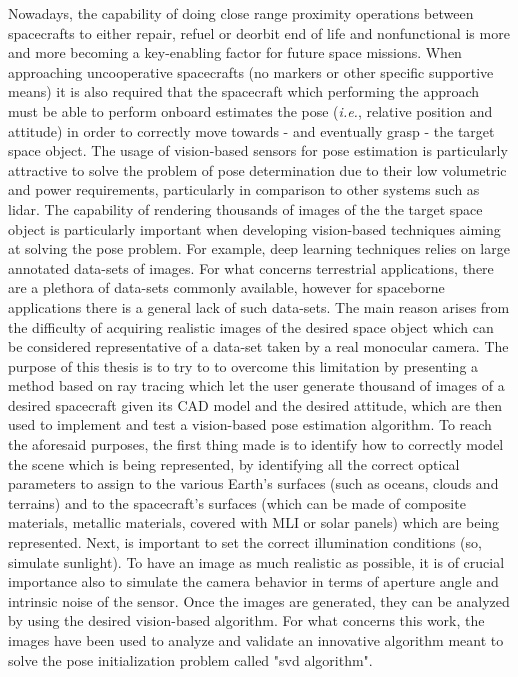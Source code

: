 Nowadays, the capability of doing close range proximity operations between spacecrafts to either repair, refuel or deorbit end of life and nonfunctional is more and more becoming a key-enabling factor for future space missions. When approaching uncooperative spacecrafts (no markers or other specific supportive means) it is also required that the spacecraft which performing the approach must be able to perform onboard estimates the pose (\textit{i.e.}, relative position and attitude) in order to correctly move towards - and eventually grasp - the target space object. The usage of vision-based sensors for pose estimation is particularly attractive to solve the problem of pose determination due to their low volumetric and power requirements, particularly in comparison to other systems such as \acrshort{lidar}. The capability of rendering thousands of images of the the target space object is particularly important when developing vision-based techniques aiming at solving the pose problem. For example, deep learning techniques relies on large annotated data-sets of images. For what concerns terrestrial applications, there are a plethora of data-sets commonly available, however for spaceborne applications there is a general lack of such data-sets. The main reason arises from the difficulty of acquiring realistic images of the desired space object which can be considered representative of a data-set taken by a real monocular camera.
The purpose of this thesis is to try to to overcome this limitation by presenting a method based on ray tracing which let the user generate thousand of images of a desired spacecraft given its CAD model and the desired attitude, which are then used to implement and test a vision-based pose estimation algorithm.
To reach the aforesaid purposes, the first thing made is to identify how to correctly model the scene which is being represented, by identifying all the correct optical parameters to assign to the various Earth's surfaces (such as oceans, clouds and terrains) and to the spacecraft's surfaces (which can be made of composite materials, metallic materials, covered with MLI or solar panels) which are being represented. Next, is important to set the correct illumination conditions (so, simulate sunlight). To have an image as much realistic as possible, it is of crucial importance also to simulate the camera behavior in terms of aperture angle and intrinsic noise of the sensor. Once the images are generated, they can be analyzed by using the desired vision-based algorithm. For what concerns this work, the images have been used to analyze and validate an innovative algorithm meant to solve the pose initialization problem called "\acrshort{svd} algorithm".
